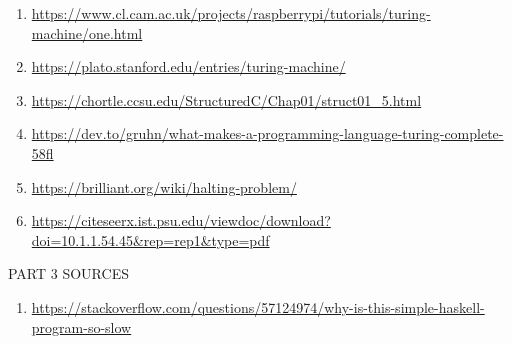 \documentclass{article}
\begin{document}
\begin{enumerate}
\item \href {https://www.cl.cam.ac.uk/projects/raspberrypi/tutorials/turing-machine/one.html}{https://www.cl.cam.ac.uk/projects/raspberrypi/tutorials/turing-machine/one.html}
\item \href {https://plato.stanford.edu/entries/turing-machine/} {https://plato.stanford.edu/entries/turing-machine/}
\item \href {https://chortle.ccsu.edu/StructuredC/Chap01/struct01_5.html} {https://chortle.ccsu.edu/StructuredC/Chap01/struct01_5.html}
\item \href {https://dev.to/gruhn/what-makes-a-programming-language-turing-complete-58fl} {https://dev.to/gruhn/what-makes-a-programming-language-turing-complete-58fl}
\item \href {https://brilliant.org/wiki/halting-problem/}{https://brilliant.org/wiki/halting-problem/}
\item \href {https://citeseerx.ist.psu.edu/viewdoc/download?doi=10.1.1.54.45&rep=rep1&type=pdf} {https://citeseerx.ist.psu.edu/viewdoc/download?doi=10.1.1.54.45&rep=rep1&type=pdf}
\end{enumerate}

PART 3 SOURCES
\begin{enumerate}
    \item \href {https://stackoverflow.com/questions/57124974/why-is-this-simple-haskell-program-so-slow}{https://stackoverflow.com/questions/57124974/why-is-this-simple-haskell-program-so-slow}
\end{enumerate}
\end{document}
